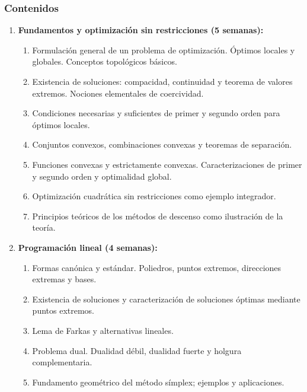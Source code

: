 \begin{refsection}
\subsubsection*{Contenidos}
\begin{enumerate}
\item \textbf{Fundamentos y optimización sin restricciones (5 semanas):}
\begin{enumerate}
    \item Formulación general de un problema de optimización. Óptimos locales y globales. Conceptos topológicos básicos.
    \item Existencia de soluciones: compacidad, continuidad y teorema de valores extremos. Nociones elementales de coercividad.
    \item Condiciones necesarias y suficientes de primer y segundo orden para óptimos locales.
    \item Conjuntos convexos, combinaciones convexas y teoremas de separación.
    \item Funciones convexas y estrictamente convexas. Caracterizaciones de primer y segundo orden y optimalidad global.
    \item Optimización cuadrática sin restricciones como ejemplo integrador.
    \item Principios teóricos de los métodos de descenso como ilustración de la teoría.
\end{enumerate}

\item \textbf{Programación lineal (4 semanas):}
\begin{enumerate}
    \item Formas canónica y estándar. Poliedros, puntos extremos, direcciones extremas y bases.
    \item Existencia de soluciones y caracterización de soluciones óptimas mediante puntos extremos.
    \item Lema de Farkas y alternativas lineales.
    \item Problema dual. Dualidad débil, dualidad fuerte y holgura complementaria.
    \item Fundamento geométrico del método símplex; ejemplos y aplicaciones.
\end{enumerate}


\end{enumerate}
\end{refsection}

